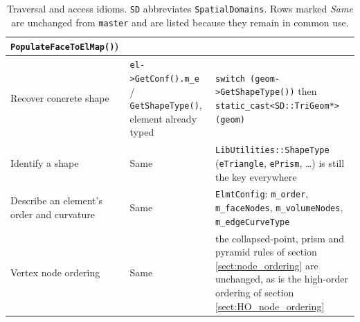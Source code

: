 \begin{table}[h!]
\begin{tabular}{p{}p{}p{}}
    \texttt{PopulateFaceToElMap()})\\
    \hline
    Recover concrete shape &
    \texttt{el->GetConf().m\_e} / \texttt{GetShapeType()}, element
    already typed &
    \texttt{switch (geom->GetShapeType())} then
    \texttt{static\_cast<SD::TriGeom*>(geom)}\\
    \hline
    Identify a shape &
    Same &
    \texttt{LibUtilities::ShapeType} (\texttt{eTriangle},
    \texttt{ePrism}, \ldots) is still the key everywhere\\
    \hline
    Describe an element's order and curvature &
    Same &
    \texttt{ElmtConfig}: \texttt{m\_order},
    \texttt{m\_faceNodes}, \texttt{m\_volumeNodes},
    \texttt{m\_edgeCurveType}\\
    \hline
    Vertex node ordering &
    Same &
    the collapsed-point, prism and pyramid rules of section
    \ref{sect:node_ordering} are unchanged, as is the high-order
    ordering of section \ref{sect:HO_node_ordering}\\
    \hline
  \end{tabular}
  \caption{Traversal and access idioms. \texttt{SD} abbreviates
    \texttt{SpatialDomains}. Rows marked \textit{Same} are unchanged
    from \texttt{master} and are listed because they remain in common
    use.}
  \label{tab:ops_traversal}
\end{table}

